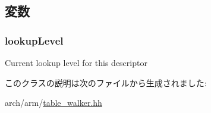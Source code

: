 \subsection{変数}
\hypertarget{classArmISA_1_1TableWalker_1_1DescriptorBase_a88477771eb7d27741455a8035678c67a}{
\subsubsection[{lookupLevel}]{ {\bf lookupLevel}}}
\label{classArmISA_1_1TableWalker_1_1DescriptorBase_a88477771eb7d27741455a8035678c67a}
Current lookup level for this descriptor 

このクラスの説明は次のファイルから生成されました:\begin{DoxyCompactItemize}
\item 
arch/arm/\hyperlink{table__walker_8hh}{table\_\-walker.hh}\end{DoxyCompactItemize}
